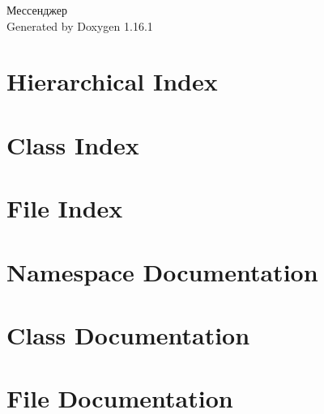 \documentclass[twoside]{book}
\newcommand{\+}{\discretionary{\mbox{\scriptsize$\hookleftarrow$}}{}{}}
\newcommand{\clearemptydoublepage}{%
    \newpage{\pagestyle{empty}\cleardoublepage}%
  }
\begin{document}
  \raggedbottom
    \hypersetup{pageanchor=false,
                bookmarksnumbered=true,
                pdfencoding=unicode
               }
  \begin{titlepage}
  \vspace*{7cm}
  \begin{center}%
  {\Large Мессенджер}\\
  \vspace*{1cm}
  {\large Generated by Doxygen 1.16.1}\\
  \end{center}
  \end{titlepage}
  \clearemptydoublepage
  \tableofcontents
  \clearemptydoublepage
  \hypersetup{pageanchor=true}

\chapter{Hierarchical Index}

\chapter{Class Index}

\chapter{File Index}

\chapter{Namespace Documentation}

\chapter{Class Documentation}










\chapter{File Documentation}


















  \backmatter
  \newpage
  \clearemptydoublepage
  \printindex
\end{document}
